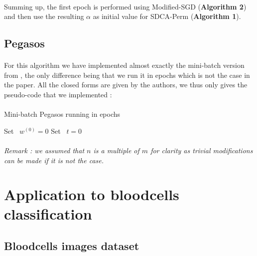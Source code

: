 \documentclass[10pt,a4paper]{article}
\begin{document}
\paragraph{}
Summing up, the first epoch is performed using Modified-SGD (\textbf{Algorithm 2}) and then use the resulting $\alpha$ as initial value for SDCA-Perm (\textbf{Algorithm 1}).


\subsection{Pegasos}

\paragraph{}
For this algorithm we have implemented almost exactly the mini-batch version from \cite{1}, the only difference being that we run it in epochs which is not the case in the paper. All the closed forms are given by the authors, we thus only gives the pseudo-code that we implemented : 


\paragraph{}
\begin{algorithm}[H]
\caption{Mini-batch Pegasos running in epochs}
\SetAlgoLined
{}
Set ~$w^{(0)} = 0$\;
Set ~$t = 0$\;
\end{algorithm}

\paragraph{}
\textit{Remark : we assumed that $n$ is a multiple of $m$ for clarity as trivial modifications can be made if it is not the case.}


\section{Application to bloodcells classification}

\subsection{Bloodcells images dataset}
\end{document}
